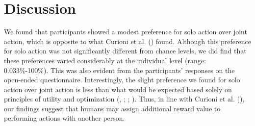 \documentclass[
  man,
  floatsintext,
  longtable,
  nolmodern,
  notxfonts,
  notimes,
  mask,
  colorlinks=true,linkcolor=blue,citecolor=blue,urlcolor=blue]{apa7}
\begin{document}
\clearpage

\section{Discussion}\label{discussion}

We found that participants showed a modest preference for solo action
over joint action, which is opposite to what Curioni et al.
() found. Although this preference for
solo action was not significantly different from chance levels, we did
find that these preferences varied considerably at the individual level
(range: 0.033\%-100\%). This was also evident from the participants'
responses on the open-ended questionnaire. Interestingly, the slight
preference we found for solo action over joint action is less than what
would be expected based solely on principles of utility and optimization
(,
;
;
). Thus, in line with Curioni
et al. (), our findings suggest that
humans may assign additional reward value to performing actions with
another person.
\end{document}
